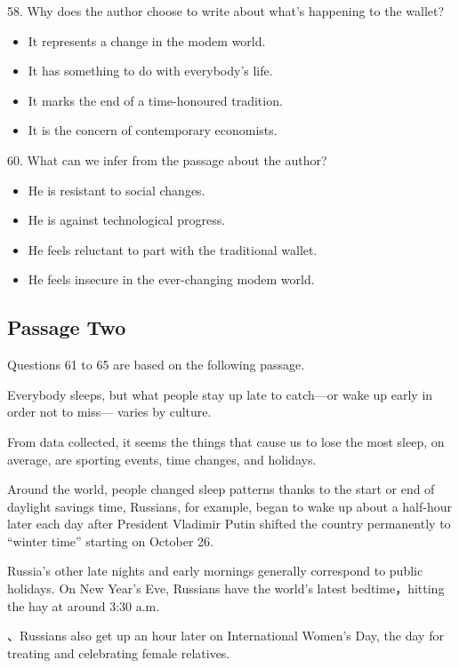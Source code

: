 \documentclass[UTF8,11pt]{ctexart}
\begin{document}
58. Why does the author choose to write about what’s happening to the wallet?


\begin{itemize}[leftmargin=2em,itemsep=.2em,topsep=.4em]\item[A.] It represents a change in the modem world.
\item[B.] It has something to do with everybody’s life.
\item[C.] It marks the end of a time-honoured tradition.
\item[D.] It is the concern of contemporary economists.
\end{itemize}

60. What can we infer from the passage about the author?


\begin{itemize}[leftmargin=2em,itemsep=.2em,topsep=.4em]\item[A.] He is resistant to social changes.
\item[B.] He is against technological progress.
\item[C.] He feels reluctant to part with the traditional wallet.
\item[D.] He feels insecure in the ever-changing modem world.
\end{itemize}

\subsection*{Passage Two}


Questions 61 to 65 are based on the following passage.


Everybody sleeps, but what people stay up late to catch—or wake up early in order not to miss— varies by culture.


From data collected, it seems the things that cause us to lose the most sleep, on average, are sporting events, time changes, and holidays.


Around the world, people changed sleep patterns thanks to the start or end of daylight savings time, Russians, for example, began to wake up about a half-hour later each day after President Vladimir Putin shifted the country permanently to “winter time” starting on October 26.


Russia’s other late nights and early mornings generally correspond to public holidays. On New Year’s Eve, Russians have the world’s latest bedtime，hitting the hay at around 3:30 a.m.


、Russians also get up an hour later on International Women’s Day, the day for treating and celebrating female relatives.
\end{document}
